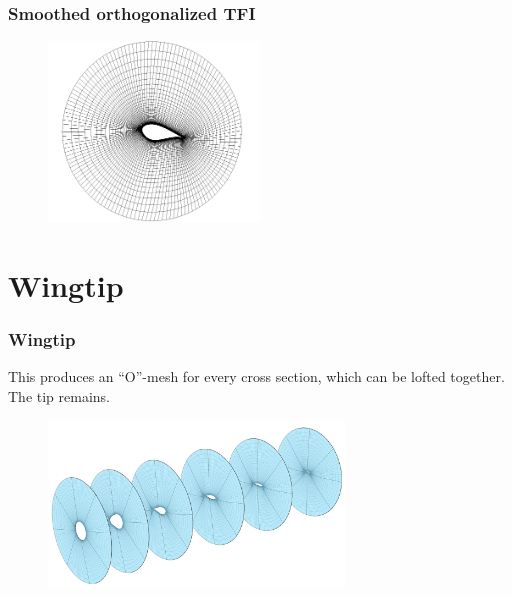 \documentclass{beamer}
\begin{document}
\begin{frame}
  \frametitle{Smoothed orthogonalized TFI}

  \begin{figure}
    \centering
    \includegraphics[width=0.5\textwidth]{figs/section12_smooth}
  \end{figure}
\end{frame}

\section{Wingtip}

\begin{frame}
  \frametitle{Wingtip}

  This produces an ``O''-mesh for every cross section, which can be lofted together.  The tip remains.

  \begin{figure}
    \centering
    \includegraphics[width=0.7\textwidth]{figs/crossecs2}
  \end{figure}
\end{frame}
\end{document}
